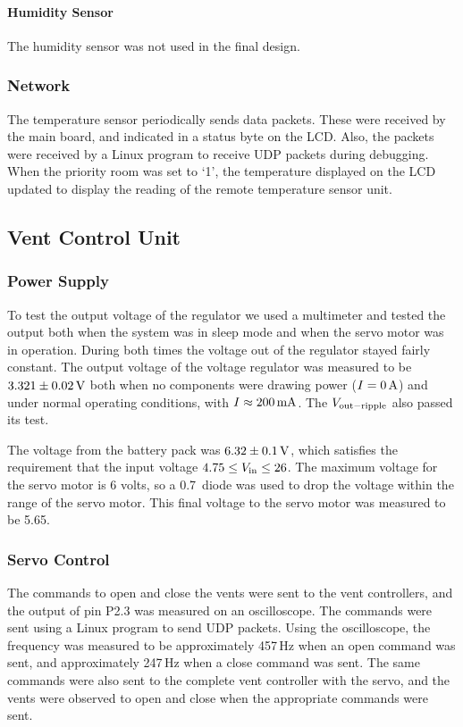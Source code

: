 \paragraph{Humidity Sensor}
The humidity sensor was not used in the final design.

\subsubsection{Network}
The temperature sensor periodically sends data packets.  These were received by the main board, and indicated in a status byte on the LCD.  Also, the packets were received by a Linux program to receive UDP packets during debugging.  When the priority room was set to `1', the temperature displayed on the LCD updated to display the reading of the remote temperature sensor unit.

\subsection{Vent Control Unit}
\subsubsection{Power Supply}
To test the output voltage of the regulator we used a multimeter and tested the output both when the system was in sleep mode and when the servo motor was in operation. During both times the voltage out of the regulator stayed fairly constant. The output voltage of the voltage regulator was measured to be $3.321 \pm 0.02\mbox{\,V}$ both when no components were drawing power ($I=0\mbox{\,A}$) and under normal operating conditions, with $I\approx200\mbox{\,mA}$. The $V_{\rm out-ripple}$ also passed its test.

The voltage from the battery pack was $6.32 \pm 0.1 \mbox{\,V}$, which satisfies the requirement that the input voltage $4.75 \leq V_{\rm in} \leq 26$. The maximum voltage for the servo motor is 6 volts, so a 0.7\volts\ diode was used to drop the voltage within the range of the servo motor. This final voltage to the servo motor was measured to be 5.65\volts .

\subsubsection{Servo Control}
The commands to open and close the vents were sent to the vent controllers, and the output of pin P2.3 was measured on an oscilloscope. The commands were sent using a Linux program to send UDP packets.  Using the oscilloscope, the frequency was measured to be approximately 457\,Hz when an open command was sent, and approximately 247\,Hz when a close command was sent. The same commands were also sent to the complete vent controller with the servo, and the vents were observed to open and close when the appropriate commands were sent.

